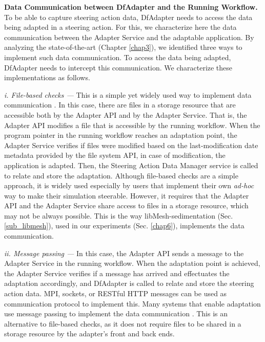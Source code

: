 
\textbf{Data Communication between DfAdapter
and the Running Workflow.}
\label{data_comm_impl}
To be able to capture steering action data, DfAdapter needs to
access the data being adapted in a steering action.
For this, we characterize here the data communication between the Adapter Service and the adaptable application.
By analyzing the state-of-the-art (Chapter \ref{chap3}), we identified three ways to implement such data communication.
To access the data being adapted, DfAdapter needs to intercept this communication. We characterize these
implementations as follows.

\emph{i. File-based checks ---} This is a simple yet widely used way to
implement data communication \cite{Bauer2016In}.
In this case, there are files in a storage resource that are accessible
both by the Adapter API and by the Adapter Service.
That is, the Adapter API modifies a file that is accessible by the running workflow.
When the program pointer in the running workflow reaches an adaptation point,
the Adapter Service verifies if files
were modified based on the last-modification date metadata provided by the file system API, in case of modification, the application is adapted.
Then, the Steering Action Data Manager service is called to relate and store the adaptation.
Although
file-based checks are a simple approach, it is widely used especially by
users that implement their own \emph{ad-hoc} way to make their
simulation steerable.
However, it requires that the Adapter API and the Adapter Service share access to files in a storage resource, which
may not be always possible. This is the way libMesh-sedimentation (Sec. \ref{sub_libmesh}), used in our experiments (Sec. \ref{chap6}), implements the data communication.

\emph{ii. Message passing ---} In this case, the Adapter API sends a message to the Adapter Service in the
running workflow. When the adaptation point is achieved, the Adapter Service verifies if a message has arrived and effectuates the
adaptation accordingly, and DfAdapter is called to relate and store the
steering action data.
MPI, sockets, or RESTful HTTP messages can be used as
communication protocol to implement this.
Many systems that enable adaptation use message passing to implement the data communication
\cite{Pickles2005practical,Figueira2004CS_LITE:,Knezevic2011Interactive}.
This is an alternative to file-based checks, as it does not require
files to be shared in a storage resource by the adapter's front and back
ends.

